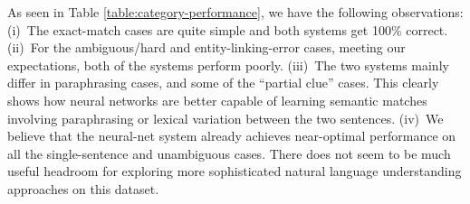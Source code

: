 As seen in Table \ref{table:category-performance}, we have the following observations: (i)~The exact-match cases are quite simple and both systems get 100\% correct. (ii)~For the ambiguous\slash hard and entity-linking-error cases, meeting our expectations, both of the systems perform poorly. (iii)~The two systems mainly differ in paraphrasing cases, and some of the ``partial clue'' cases. This clearly shows how neural networks are better capable of learning semantic matches involving paraphrasing or lexical variation between the two sentences. (iv)~We believe that the neural-net system already achieves near-optimal performance on all the single-sentence and unambiguous cases. There does not seem to be much useful headroom for exploring more sophisticated natural language understanding approaches on this dataset.

